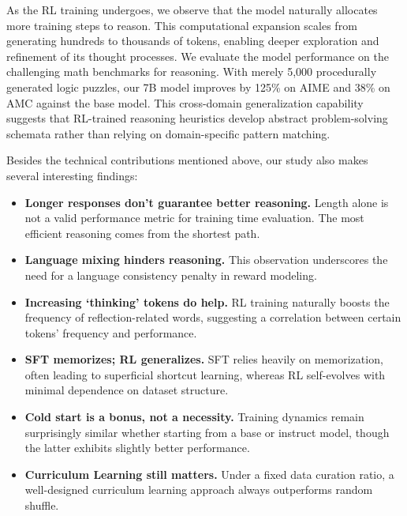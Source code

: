 As the RL training undergoes, we observe that the model naturally allocates more training steps to reason. This computational expansion scales from generating hundreds to thousands of tokens, enabling deeper exploration and refinement of its thought processes.
We evaluate the model performance on the challenging math benchmarks for reasoning.
With merely 5,000 procedurally generated logic puzzles, our 7B model improves by 125\% on AIME and 38\% on AMC against the base model.
This cross-domain generalization capability suggests that RL-trained reasoning heuristics develop abstract problem-solving schemata rather than relying on domain-specific pattern matching.

Besides the technical contributions mentioned above, our study also makes several interesting findings:
\vspace{-5mm}
\begin{itemize}[leftmargin=*]
    \item \textbf{Longer responses don’t guarantee better reasoning.} 
    Length alone is not a valid performance metric for training time evaluation. The most efficient reasoning comes from the shortest path.
    \item \textbf{Language mixing hinders reasoning.} This observation underscores the need for a language consistency penalty in reward modeling.
    \item \textbf{Increasing `thinking' tokens do help.} RL training naturally boosts the frequency of reflection-related words, suggesting a correlation between certain tokens' frequency and performance.
    \item \textbf{SFT memorizes; RL generalizes.} SFT relies heavily on memorization, often leading to superficial shortcut learning, whereas RL self-evolves with minimal dependence on dataset structure. 
    \item \textbf{Cold start is a bonus, not a necessity.} Training dynamics remain surprisingly similar whether starting from a base or instruct model, though the latter exhibits slightly better performance.
    \item  \textbf{Curriculum Learning still matters.} Under a fixed data curation ratio, a well-designed curriculum learning approach always outperforms random shuffle.
\end{itemize}
